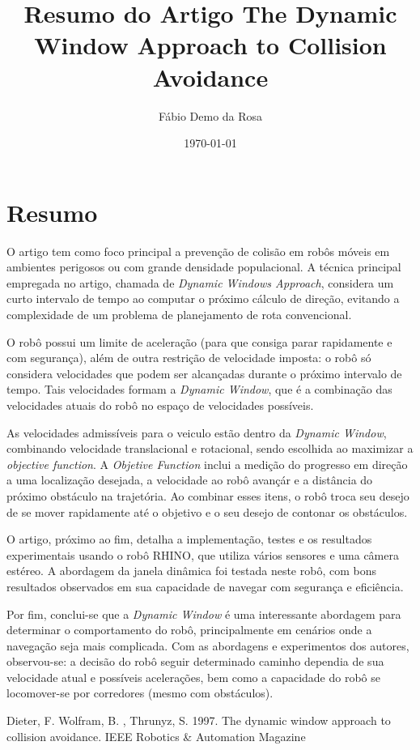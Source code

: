 \documentclass[12pt, a4paper]{article}
\begin{document}
\title{Resumo do Artigo The Dynamic Window Approach to Collision Avoidance}
\author{Fábio Demo da Rosa}
\date{\today}

\maketitle

\section*{Resumo}
	O artigo tem como foco principal a prevenção de colisão em robôs móveis em ambientes perigosos ou com grande densidade populacional.
	A técnica principal empregada no artigo, chamada de \textit{Dynamic Windows Approach}, considera um curto intervalo de tempo ao computar o próximo cálculo de direção, evitando a complexidade de um problema de planejamento de rota convencional.

	O robô possui um limite de aceleração (para que consiga parar rapidamente e com segurança), além de outra restrição de velocidade imposta: o robô só considera velocidades que podem ser alcançadas durante o próximo intervalo de tempo. 
	Tais velocidades formam a \textit{Dynamic Window}, que é a combinação das velocidades atuais do robô no espaço de velocidades possíveis.

	As velocidades admissíveis para o veiculo estão dentro da \textit{Dynamic Window}, combinando velocidade translacional e rotacional, sendo escolhida ao maximizar a \textit{objective function}. A \textit{Objetive Function} inclui a medição do progresso em direção a uma localização desejada, a velocidade ao robô avançár e a distância do próximo obstáculo na trajetória.
	Ao combinar esses itens, o robô troca seu desejo de se mover rapidamente até o objetivo e o seu desejo de contonar os obstáculos.

	O artigo, próximo ao fim, detalha a implementação, testes e os resultados experimentais usando o robô RHINO, que utiliza vários sensores e uma câmera estéreo. A abordagem da janela dinâmica foi testada neste robô, com bons resultados observados em sua capacidade de navegar com segurança e eficiência.

	Por fim, conclui-se que a \textit{Dynamic Window} é uma interessante abordagem para determinar o comportamento do robô, principalmente em cenários onde a navegação seja mais complicada. Com as abordagens e experimentos dos autores, observou-se: a decisão do robô seguir determinado caminho dependia de sua velocidade atual e possíveis acelerações, bem como a capacidade do robô se locomover-se por corredores (mesmo com obstáculos).

	\begin{thebibliography}{2}

		 Dieter, F. Wolfram, B. , Thrunyz, S. 1997. The dynamic window approach to collision avoidance. IEEE Robotics \& Automation Magazine
		
		\end{thebibliography}
		
	
\end{document}
